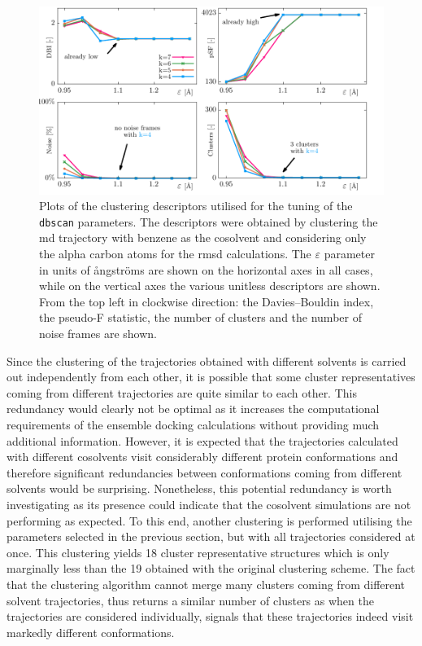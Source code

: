 \begin{figure}
\centering
\includegraphics[width=\textwidth]{sections/results/images/benzene_clustering_ca/to_pdf/benzene_clustering_ca_to_pdf.pdf}
\caption{Plots of the clustering descriptors utilised for the tuning of the  \texttt{dbscan} parameters.
The descriptors were obtained by clustering the \gls{md} trajectory with benzene as the cosolvent and considering only the alpha carbon atoms for the \gls{rmsd} calculations.
The $\varepsilon$ parameter in units of \aa{}ngstr\"oms are shown on the horizontal axes in all cases, while on the vertical axes the various unitless descriptors are shown.
From the top left in clockwise direction: the Davies--Bouldin index, the pseudo-F statistic, the number of clusters and the number of noise frames are shown.}
\label{fig:benzene_clustering_ca}
\end{figure}

Since the clustering of the trajectories obtained with different solvents is carried out independently from each other, it is possible that some cluster representatives coming from different trajectories are quite similar to each other.
This redundancy would clearly not be optimal as it increases the computational requirements of the ensemble docking calculations without providing much additional information.
However, it is expected that the trajectories calculated with different cosolvents visit considerably different protein conformations and therefore significant redundancies between conformations coming from different solvents would be surprising.
Nonetheless, this potential redundancy is worth investigating as its presence could indicate that the cosolvent simulations are not performing as expected.
To this end, another clustering is performed utilising the parameters selected in the previous section, but with all trajectories considered at once.
This clustering yields 18 cluster representative structures which is only marginally less than the 19 obtained with the original clustering scheme.
The fact that the clustering algorithm cannot merge many clusters coming from different solvent trajectories, thus returns a similar number of clusters as when the trajectories are considered individually, signals that these trajectories indeed visit markedly different conformations.

